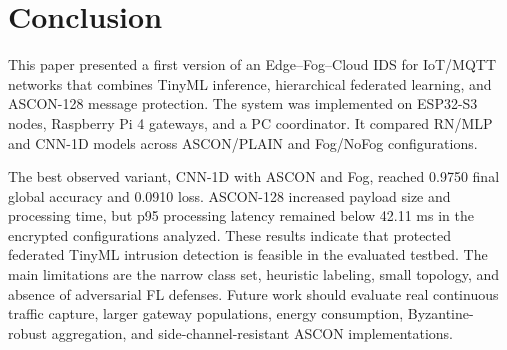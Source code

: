 \documentclass[runningheads]{llncs}
\begin{document}
\section{Conclusion}

This paper presented a first version of an Edge--Fog--Cloud IDS for IoT/MQTT networks that combines TinyML inference, hierarchical federated learning, and ASCON-128 message protection. The system was implemented on ESP32-S3 nodes, Raspberry Pi 4 gateways, and a PC coordinator. It compared RN/MLP and CNN-1D models across ASCON/PLAIN and Fog/NoFog configurations.

The best observed variant, CNN-1D with ASCON and Fog, reached 0.9750 final global accuracy and 0.0910 loss. ASCON-128 increased payload size and processing time, but p95 processing latency remained below 42.11 ms in the encrypted configurations analyzed. These results indicate that protected federated TinyML intrusion detection is feasible in the evaluated testbed. The main limitations are the narrow class set, heuristic labeling, small topology, and absence of adversarial FL defenses. Future work should evaluate real continuous traffic capture, larger gateway populations, energy consumption, Byzantine-robust aggregation, and side-channel-resistant ASCON implementations.



\end{document}
